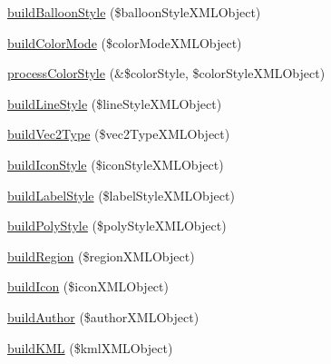 \begin{DoxyCompactItemize}
\hyperlink{KMLBuilder_8php_af7f09b4727eae31b0bb0de56734630a1}{buildBalloonStyle} (\$balloonStyleXMLObject)
\item 
\hyperlink{KMLBuilder_8php_a175f7d407e8c4e04db42de6621d0c735}{buildColorMode} (\$colorModeXMLObject)
\item 
\hyperlink{KMLBuilder_8php_a0494376e6a83541a9e668fd0b8a1f7b2}{processColorStyle} (\&\$colorStyle, \$colorStyleXMLObject)
\item 
\hyperlink{KMLBuilder_8php_aa7a95b19ae4892c4b64c23a32321054e}{buildLineStyle} (\$lineStyleXMLObject)
\item 
\hyperlink{KMLBuilder_8php_ae7e15a212ff7d0c4eedfd84072a320f7}{buildVec2Type} (\$vec2TypeXMLObject)
\item 
\hyperlink{KMLBuilder_8php_a4c871cd63971b3e3245fe5225321ed0c}{buildIconStyle} (\$iconStyleXMLObject)
\item 
\hyperlink{KMLBuilder_8php_aa395a59ca1d88f5002532867cd8c92f2}{buildLabelStyle} (\$labelStyleXMLObject)
\item 
\hyperlink{KMLBuilder_8php_a886ddeaee9018aa1e32c31669d543c8f}{buildPolyStyle} (\$polyStyleXMLObject)
\item 
\hyperlink{KMLBuilder_8php_a0c34948e3da2a5f248f82200b06d99fc}{buildRegion} (\$regionXMLObject)
\item 
\hyperlink{KMLBuilder_8php_a61797599818c3277773f6e060b18a12d}{buildIcon} (\$iconXMLObject)
\item 
\hyperlink{KMLBuilder_8php_a9be1281f5a578aa96543c2b4f8f34470}{buildAuthor} (\$authorXMLObject)
\item 
\hyperlink{KMLBuilder_8php_a3c9784bff8a45a956bf9e898be36b9f5}{buildKML} (\$kmlXMLObject)
\end{DoxyCompactItemize}


